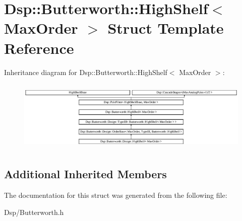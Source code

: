 \hypertarget{structDsp_1_1Butterworth_1_1HighShelf}{\section{Dsp\-:\-:Butterworth\-:\-:High\-Shelf$<$ Max\-Order $>$ Struct Template Reference}
\label{structDsp_1_1Butterworth_1_1HighShelf}
}
Inheritance diagram for Dsp\-:\-:Butterworth\-:\-:High\-Shelf$<$ Max\-Order $>$\-:\begin{figure}[H]
\begin{center}
\leavevmode
\includegraphics[height=3.449692cm]{structDsp_1_1Butterworth_1_1HighShelf}
\end{center}
\end{figure}
\subsection*{Additional Inherited Members}


The documentation for this struct was generated from the following file\-:\begin{DoxyCompactItemize}
\item 
Dsp/Butterworth.\-h\end{DoxyCompactItemize}
